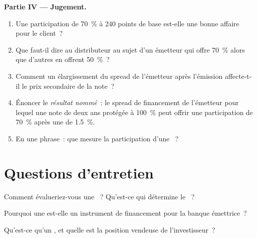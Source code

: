\begin{problem}
\medskip\noindent\textbf{Partie IV --- Jugement.}
\begin{enumerate}[resume]
\item Une participation de 70~\% à 240 points de base est-elle une bonne affaire pour le client~?
\item Que faut-il dire au distributeur au sujet d'un émetteur qui offre 70~\% alors que d'autres en offrent 50~\%~?
\item Comment un élargissement du spread de l'émetteur après l'émission affecte-t-il le prix secondaire de la note~?
\item Énoncer le \emph{résultat nommé}~: le spread de financement de l'émetteur pour lequel une note de deux ans protégée à 100~\% peut offrir une participation de 70~\% après une
 de 1.5~\%.
\item En une phrase~: que mesure la participation d'une ~?
\end{enumerate}
\end{problem}

\section{Questions d'entretien}

\begin{interviewq}\label{iq:dv:the-structured-products-business:1}
Comment évalueriez-vous une ~? Qu'est-ce qui détermine le ~?
\end{interviewq}

\begin{interviewq}\label{iq:dv:the-structured-products-business:2}
Pourquoi une  est-elle un instrument de financement pour la banque émettrice~?
\end{interviewq}

\begin{interviewq}\label{iq:dv:the-structured-products-business:3}
Qu'est-ce qu'un , et quelle est la position vendeuse de l'investisseur~?
\end{interviewq}

